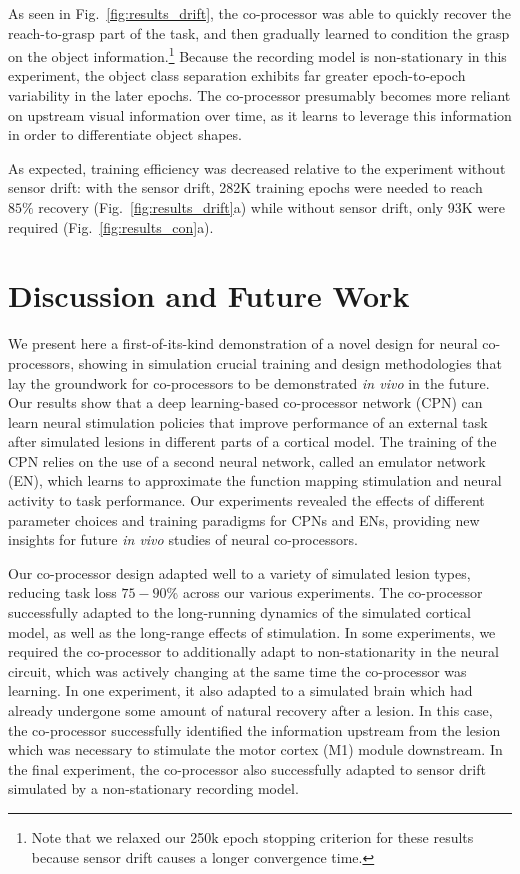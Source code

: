 \documentclass[12pt]{iopart}
\begin{document}
As seen in Fig.~\ref{fig:results_drift}, the co-processor was able to quickly
recover the reach-to-grasp part of the task, and then gradually learned to
condition the grasp on the object information.\footnote{Note that we relaxed our 250k epoch
         stopping criterion for these results because sensor drift causes a longer
         convergence time.} Because the recording model is non-stationary
in this experiment, the object class separation exhibits far greater epoch-to-epoch
variability in the later epochs. The co-processor presumably becomes more
reliant on upstream visual information over time, as it learns to leverage this information 
in order to differentiate object shapes.

As expected, training efficiency was decreased relative to the experiment without sensor
drift: with the sensor drift, 282K training epochs were needed to reach $85\%$ recovery
(Fig.~\ref{fig:results_drift}a) while without sensor drift, only 93K were required
(Fig.~\ref{fig:results_con}a).

\section{Discussion and Future Work}
\label{sec:discussion}

We present here a first-of-its-kind demonstration of a novel design for neural co-processors,
showing in simulation crucial training and design methodologies that lay the groundwork for
co-processors to be demonstrated \textit{in vivo} in the future. Our results show that a deep
learning-based co-processor network (CPN) can learn neural stimulation policies that improve
performance of an external task after simulated lesions in different parts of a cortical model.
The training of the CPN relies on the use of a second neural network, called an emulator network (EN), 
which learns to approximate the function mapping stimulation and neural activity to task performance.
Our experiments revealed the effects of different parameter choices and training paradigms for CPNs and
ENs, providing new insights for future {\em in vivo} studies of neural co-processors.

Our co-processor design adapted well to a variety of simulated lesion types, reducing task loss
$75-90\%$ across our various experiments. The co-processor successfully adapted to
the long-running dynamics of the simulated cortical model, as well as the long-range effects of
stimulation. In some experiments, we required the co-processor to additionally adapt to non-stationarity in
the neural circuit, which was actively changing at the same time the co-processor was learning. In one
experiment, it also adapted to a simulated brain which had already undergone some amount of natural recovery
after a lesion. In this case, the co-processor successfully identified the information upstream from the 
lesion which was necessary to stimulate the motor cortex (M1) module downstream. In the final experiment,
the co-processor also successfully adapted to sensor drift simulated by a non-stationary recording model.
\end{document}
